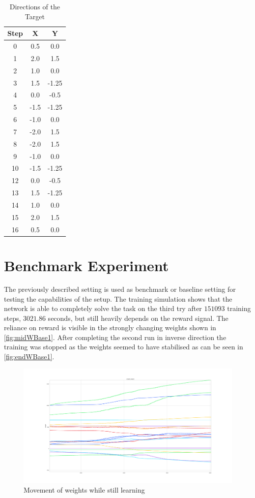 \begin{table}[htpb]
  \caption[Ball Directions]{Directions of the Target} \label{tab:ballMove}
  \centering
  \begin{tabular}{|c| c |c|}
      \toprule
      Step & X & Y  \\
      \midrule
        0 &  0.5 & 0.0 \\
        1 &  2.0 & 1.5 \\
        2 &  1.0 & 0.0 \\
        3 &  1.5 & -1.25 \\
        4 &  0.0 & -0.5 \\
        5 &  -1.5 & -1.25 \\
        6 &  -1.0 & 0.0 \\
        7 &  -2.0 & 1.5 \\
        8 &  -2.0 & 1.5 \\
        9 &  -1.0 & 0.0 \\
        10 &  -1.5 & -1.25 \\
        12 &  0.0 & -0.5 \\
        13 &  1.5 & -1.25 \\
        14 &  1.0 & 0.0 \\
        15 &  2.0 & 1.5 \\
        16 &  0.5 & 0.0 \\ 
      \bottomrule
  \end{tabular}
\end{table}

\section{Benchmark Experiment}
The previously described setting is used as benchmark or baseline setting for testing the capabilities of the setup. 
The training simulation shows that the network is able to completely solve the task on the third try after $151093$ training steps, $3021.86$ seconds, but still heavily depends on the reward signal. The reliance on reward is visible in the strongly changing weights shown in \autoref{fig:midWBase1}. After completing the second run in inverse direction the training was stopped as the weights seemed to have stabilised as can be seen in \autoref{fig:endWBase1}.

\begin{figure}[htpb]
  \centering
  \includegraphics[width=\textwidth]{figures/plots/midWBase1}
  \caption{Movement of weights while still learning }
  \label{fig:midWBase1}
\end{figure}


